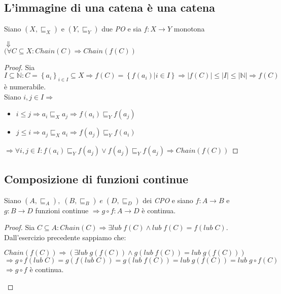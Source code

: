 \
\subsection{L'immagine di una catena è una catena}
\begin{esercizio}
  Siano $(X, \sqsubseteq_X)$ e $(Y, \sqsubseteq_Y)$ due \emph{PO} e sia $f: X \rightarrow Y$ monotona
  \begin{center}
    $\Downarrow$\\
    $(\forall C \subseteq X : Chain(C) \Rightarrow Chain(f(C))$
  \end{center}
  \begin{proof}
    Sia $I \subseteq \mathbb{N} : C = \left\{a_i\right\}_{i \in I} \subseteq X \Rightarrow f(C) = \left\{f(a_i) | i \in I\right\} \Rightarrow |f(C)| \leq |I| \leq |\mathbb{N}| \Rightarrow f(C)$ è numerabile.\\
    Siano $i,j \in I \Rightarrow $
    \begin{itemize}
      \setlength{\itemindent}{20mm}
    \item $i \leq j \Rightarrow a_i \sqsubseteq_X a_j \Rightarrow f(a_i) \sqsubseteq_Y f(a_j)$
    \item $j \leq i \Rightarrow a_j \sqsubseteq_X a_i \Rightarrow f(a_j) \sqsubseteq_Y f(a_i)$
    \end{itemize}
    $\Rightarrow \forall i,j \in I : f(a_i) \sqsubseteq_Y f(a_j) \lor f(a_j) \sqsubseteq_Y f(a_j) \Rightarrow Chain(f(C))$
  \end{proof}
\end{esercizio}

\subsection{Composizione di funzioni continue}
\begin{esercizio}
  Siano $ (A, \sqsubseteq_A), \; (B, \sqsubseteq_B) \; e \; (D, \sqsubseteq_D) $ dei \emph{CPO} e siano $ f: A \rightarrow B $ e $ g: B \rightarrow D $ funzioni continue $ \Rightarrow g \circ f : A \rightarrow D $ è continua.
  \begin{proof}
    Sia $C \subseteq A : Chain(C) \Rightarrow \exists lub \; f(C) \land lub \; f(C) = f(lub \; C)$.
    Dall'esercizio precedente sappiamo che:
    \begin{center}
      $ Chain(f(C)) \Rightarrow (\exists lub \; g(f(C)) \land g(lub \; f(C)) = lub \; g(f(C))) $\\
      $ \Rightarrow g \circ f(lub \; C) = g(f(lub \; C)) = g(lub \; f(C)) = lub \; g(f(C)) = lub \; g \circ f(C) $\\
      $ \Rightarrow g \circ f$ è continua.
    \end{center}
  \end{proof}
\end{esercizio}

